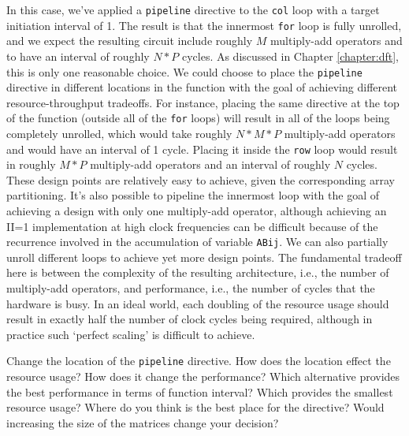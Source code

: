 In this case, we've applied a \lstinline{pipeline} directive to the \lstinline{col} loop with a target initiation interval of 1. The result is that the innermost \lstinline{for} loop is fully unrolled, and we expect the resulting circuit include roughly $M$ multiply-add operators and to have an interval of roughly $N*P$ cycles.  As discussed in Chapter \ref{chapter:dft}, this is only one reasonable choice.  We could choose to place the \lstinline{pipeline} directive in different locations in the function with the goal of achieving different resource-throughput tradeoffs. For instance, placing the same directive at the top of the function (outside all of the \lstinline{for} loops) will result in all of the loops being completely unrolled, which would take roughly $N*M*P$ multiply-add operators and would have an interval of 1 cycle. Placing it inside the \lstinline{row} loop would result in roughly $M*P$ multiply-add operators and an interval of roughly $N$ cycles. These design points are relatively easy to achieve, given the corresponding array partitioning.  It's also possible to pipeline the innermost loop with the goal of achieving a design with only one multiply-add operator, although achieving an II=1 implementation at high clock frequencies can be difficult because of the recurrence involved in the accumulation of variable \lstinline{ABij}.  We can also partially unroll different loops to achieve yet more design points.  The fundamental tradeoff here is between the complexity of the resulting architecture, i.e., the number of multiply-add operators, and performance, i.e., the number of cycles that the hardware is busy.  In an ideal world, each doubling of the resource usage should result in exactly half the number of clock cycles being required, although in practice such `perfect scaling' is difficult to achieve.

\begin{exercise}
Change the location of the \lstinline{pipeline} directive. How does the location effect the resource usage? How does it change the performance? Which alternative provides the best performance in terms of function interval? Which provides the smallest resource usage? Where do you think is the best place for the directive? Would increasing the size of the matrices change your decision?
\end{exercise}

